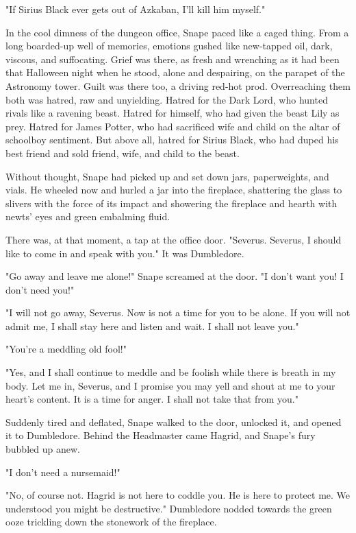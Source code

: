 "If Sirius Black ever gets out of Azkaban, I'll kill him myself."

In the cool dimness of the dungeon office, Snape paced like a caged thing. From a long boarded-up well of memories, emotions gushed like new-tapped oil, dark, viscous, and suffocating. Grief was there, as fresh and wrenching as it had been that Halloween night when he stood, alone and despairing, on the parapet of the Astronomy tower. Guilt was there too, a driving red-hot prod. Overreaching them both was hatred, raw and unyielding. Hatred for the Dark Lord, who hunted rivals like a ravening beast. Hatred for himself, who had given the beast Lily as prey. Hatred for James Potter, who had sacrificed wife and child on the altar of schoolboy sentiment. But above all, hatred for Sirius Black, who had duped his best friend and sold friend, wife, and child to the beast.

Without thought, Snape had picked up and set down jars, paperweights, and vials. He wheeled now and hurled a jar into the fireplace, shattering the glass to slivers with the force of its impact and showering the fireplace and hearth with newts' eyes and green embalming fluid.

There was, at that moment, a tap at the office door. "Severus. Severus, I should like to come in and speak with you." It was Dumbledore.

"Go away and leave me alone!" Snape screamed at the door. "I don't want you! I don't need you!"

"I will not go away, Severus. Now is not a time for you to be alone. If you will not admit me, I shall stay here and listen and wait. I shall not leave you."

"You're a meddling old fool!"

"Yes, and I shall continue to meddle and be foolish while there is breath in my body. Let me in, Severus, and I promise you may yell and shout at me to your heart's content. It is a time for anger. I shall not take that from you."

Suddenly tired and deflated, Snape walked to the door, unlocked it, and opened it to Dumbledore. Behind the Headmaster came Hagrid, and Snape's fury bubbled up anew.

"I don't need a nursemaid!"

"No, of course not. Hagrid is not here to coddle you. He is here to protect me. We understood you might be{\el} destructive." Dumbledore nodded towards the green ooze trickling down the stonework of the fireplace.


